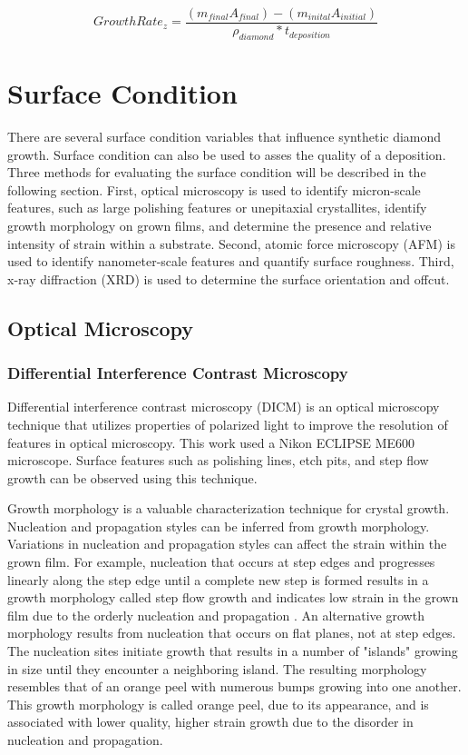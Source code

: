 \begin{equation}
\label{totalToVertGR}
    Growth Rate_z= \frac{(m_{final}A_{final})-(m_{inital}A_{initial})}{\rho_{diamond} *t_{deposition}}
\end{equation}

\section{Surface Condition}
\label{sectionSurfaceCondition}
\indent

There are several surface condition variables that influence synthetic diamond growth. Surface condition can also be used to asses the quality of a deposition. Three methods for evaluating the surface condition will be described in the following section. First, optical microscopy is used to identify micron-scale features, such as large polishing features or unepitaxial crystallites, identify growth morphology on grown films, and determine the presence and relative intensity of strain within a substrate. Second, atomic force microscopy (AFM) is used to identify nanometer-scale features and quantify surface roughness. Third, x-ray diffraction (XRD) is used to determine the surface orientation and offcut.

\subsection{Optical Microscopy}
\subsubsection{Differential Interference Contrast Microscopy}
\label{DICM}
\indent

Differential interference contrast microscopy (DICM) is an optical microscopy technique that utilizes properties of polarized light to improve the resolution of features in optical microscopy. This work used a Nikon ECLIPSE ME600 microscope. Surface features such as polishing lines, etch pits, and step flow growth can be observed using this technique.

Growth morphology is a valuable characterization technique for crystal growth. Nucleation and propagation styles can be inferred from growth morphology. Variations in nucleation and propagation styles can affect the strain within the grown film. For example, nucleation that occurs at step edges and progresses linearly along the step edge until a complete new step is formed results in a growth morphology called step flow growth and indicates low strain in the grown film due to the orderly nucleation and propagation \cite{Frenklach1997SurfaceGrowth, Sunagawa1999GrowthCrystals, Burton1951TheSurfaces, Yagi2001StepSurfaces}. An alternative growth morphology results from nucleation that occurs on flat planes, not at step edges. The nucleation sites initiate growth that results in a number of "islands" growing in size until they encounter a neighboring island. The resulting morphology resembles that of an orange peel with numerous bumps growing into one another. This growth morphology is called orange peel, due to its appearance, and is associated with lower quality, higher strain growth due to the disorder in nucleation and propagation. 

